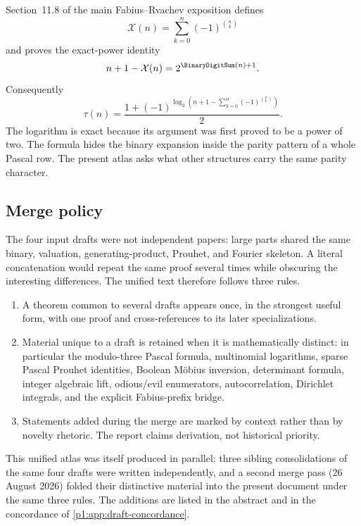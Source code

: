 \documentclass[11pt,oneside]{article}
\numberwithin{equation}{section}
\theoremstyle{definition}
\theoremstyle{remark}
\begin{document}
Section~11.8 of the main Fabius--Rvachev exposition defines
\begin{equation}
  \mathcal X(n)=\sum_{k=0}^{n}(-1)^{\binom nk}
  \label{p1:eq:source-X}
\end{equation}
and proves the exact-power identity
\begin{equation}
  n+1-\mathcal X(n)=2^{\BinaryDigitSum(n)+1}.
  \label{p1:eq:source-power}
\end{equation}
Consequently
\begin{equation}
  \tau(n)=
  \frac{1+(-1)^{\log_2\!\left(n+1-
       \sum_{k=0}^{n}(-1)^{\binom nk}\right)}}{2}.
  \label{p1:eq:source-binomial-log}
\end{equation}
The logarithm is exact because its argument was first proved to be a power of
two.  The formula hides the binary expansion inside the parity pattern of a
whole Pascal row.  The present atlas asks what other structures carry the same
parity character.

\subsection{Merge policy}

The four input drafts were not independent papers: large parts shared the same
binary, valuation, generating-product, Prouhet, and Fourier skeleton.  A literal
concatenation would repeat the same proof several times while obscuring the
interesting differences.  The unified text therefore follows three rules.

\begin{enumerate}
\item A theorem common to several drafts appears once, in the strongest useful
      form, with one proof and cross-references to its later specializations.
\item Material unique to a draft is retained when it is mathematically distinct:
      in particular the modulo-three Pascal formula, multinomial logarithms,
      sparse Pascal Prouhet identities, Boolean M\"obius inversion, determinant
      formula, integer algebraic lift, odious/evil enumerators, autocorrelation,
      Dirichlet integrals, and the explicit Fabius-prefix bridge.
\item Statements added during the merge are marked by context rather than by
      novelty rhetoric.  The report claims derivation, not historical priority.
\end{enumerate}

This unified atlas was itself produced in parallel: three sibling
consolidations of the same four drafts were written independently, and a
second merge pass (26 August 2026) folded their distinctive material into the
present document under the same three rules.  The additions are listed in the
abstract and in the concordance of \cref{p1:app:draft-concordance}.
\end{document}
